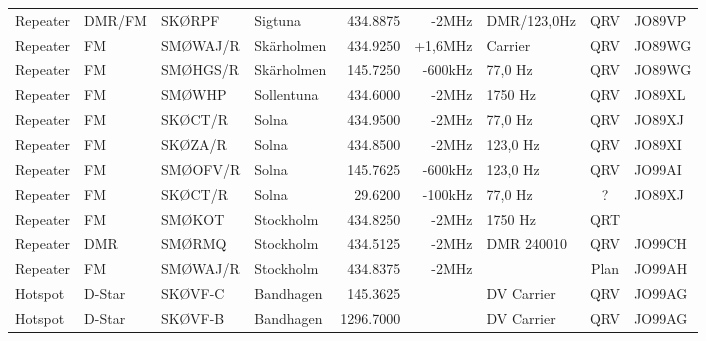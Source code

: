 \begin{landscape}
\begin{longtable}{llllrrlcl}
	Repeater          & DMR/FM       & SKØRPF        & Sigtuna      & 434.8875          & -2MHz          & DMR/123,0Hz     & QRV             & JO89VP           \\
	Repeater          & FM           & SMØWAJ/R      & Skärholmen   & 434.9250          & +1,6MHz        & Carrier         & QRV             & JO89WG           \\
	Repeater          & FM           & SMØHGS/R      & Skärholmen   & 145.7250          & -600kHz        & 77,0 Hz         & QRV             & JO89WG           \\
	Repeater          & FM           & SMØWHP        & Sollentuna   & 434.6000          & -2MHz          & 1750 Hz         & QRV             & JO89XL           \\
	Repeater          & FM           & SKØCT/R       & Solna        & 434.9500          & -2MHz          & 77,0 Hz         & QRV             & JO89XJ           \\
	Repeater          & FM           & SKØZA/R       & Solna        & 434.8500          & -2MHz          & 123,0 Hz        & QRV             & JO89XI           \\
	Repeater          & FM           & SMØOFV/R      & Solna        & 145.7625          & -600kHz        & 123,0 Hz        & QRV             & JO99AI           \\
	Repeater          & FM           & SKØCT/R       & Solna        & 29.6200           & -100kHz        & 77,0 Hz         & ?               & JO89XJ           \\
	Repeater          & FM           & SMØKOT        & Stockholm    & 434.8250          & -2MHz          & 1750 Hz         & QRT             &                  \\
	Repeater          & DMR          & SMØRMQ        & Stockholm    & 434.5125          & -2MHz          & DMR 240010      & QRV             & JO99CH           \\
	Repeater          & FM           & SMØWAJ/R      & Stockholm    & 434.8375          & -2MHz          &                 & Plan            & JO99AH           \\
	Hotspot           & D-Star       & SKØVF-C       & Bandhagen    & 145.3625          &                & DV Carrier      & QRV             & JO99AG           \\
	Hotspot           & D-Star       & SKØVF-B       & Bandhagen    & 1296.7000         &                & DV Carrier      & QRV             & JO99AG           \\

\end{longtable}
\end{landscape}
